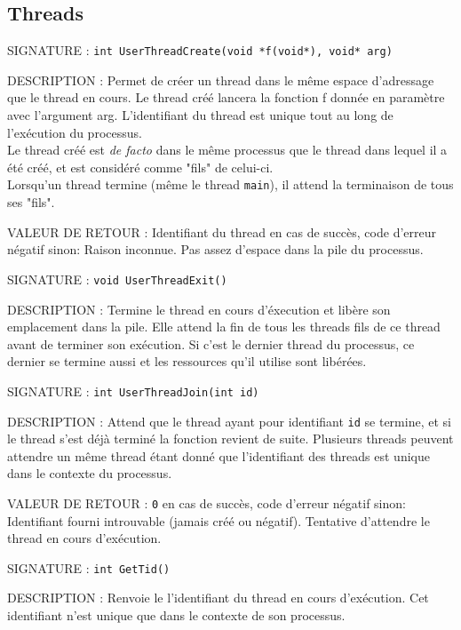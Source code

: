 \documentclass{article}
\begin{document}
	\subsection{Threads}
		\begin{description}
			\item{SIGNATURE : } \texttt{int UserThreadCreate(void *f(void*), void* arg)}
			\item{DESCRIPTION : } Permet de créer un thread dans le même espace d'adressage que le thread en cours. Le thread créé lancera la fonction f donnée en paramètre avec l'argument arg. L'identifiant du thread est unique tout au long de l'exécution du processus. \\
			Le thread créé est \emph{de facto} dans le même processus que le thread dans lequel il a été créé, et est considéré comme "fils" de celui-ci. \\
			Lorsqu'un thread termine (même le thread \texttt{main}), il attend la terminaison de tous ses "fils".
			\item{VALEUR DE RETOUR : } Identifiant du thread en cas de succès, code d'erreur négatif sinon:
				 Raison inconnue.
				 Pas assez d'espace dans la pile du processus.
		\end{description}
		\vspace{2.5mm}
		\begin{description}
			\item{SIGNATURE : } \texttt{void UserThreadExit()}
			\item{DESCRIPTION : } Termine le thread en cours d'éxecution et libère son emplacement dans la pile. Elle attend la fin de tous les threads fils de ce thread avant de terminer son exécution. Si c'est le dernier thread du processus, ce dernier se termine aussi et les ressources qu'il utilise sont libérées.
		\end{description}
		\vspace{2.5mm}
		\begin{description}
			\item{SIGNATURE : } \texttt{int UserThreadJoin(int id)}
			\item{DESCRIPTION : } Attend que le thread ayant pour identifiant \texttt{id} se termine, et si le thread s'est déjà terminé la fonction revient de suite. Plusieurs threads peuvent attendre un même thread étant donné que l'identifiant des threads est unique dans le contexte du processus.
			\item{VALEUR DE RETOUR : } \texttt{0} en cas de succès, code d'erreur négatif sinon:
				 Identifiant fourni introuvable (jamais créé ou négatif).
				 Tentative d'attendre le thread en cours d'exécution.
		\end{description}
		\vspace{2.5mm}
		\begin{description}
			\item{SIGNATURE : } \texttt{int GetTid()}
			\item{DESCRIPTION : Renvoie le l'identifiant du thread en cours d'exécution. Cet identifiant n'est unique que dans le contexte de son processus.} 
		\end{description}
\end{document}
